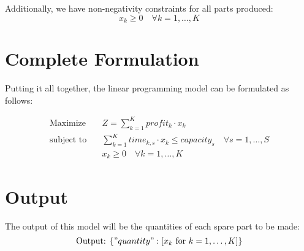 \documentclass{article}
\begin{document}
Additionally, we have non-negativity constraints for all parts produced:
\[
x_k \geq 0 \quad \forall k = 1, \ldots, K
\]

\section*{Complete Formulation}
Putting it all together, the linear programming model can be formulated as follows:

\begin{align*}
\text{Maximize} & \quad Z = \sum_{k=1}^{K} profit_k \cdot x_k \\
\text{subject to} & \quad \sum_{k=1}^{K} time_{k,s} \cdot x_k \leq capacity_s \quad \forall s = 1, \ldots, S \\
& \quad x_k \geq 0 \quad \forall k = 1, \ldots, K
\end{align*}

\section*{Output}
The output of this model will be the quantities of each spare part to be made:
\[
\text{Output: } \{ "quantity": [x_k \text{ for } k = 1, \ldots, K] \}
\]
\end{document}
